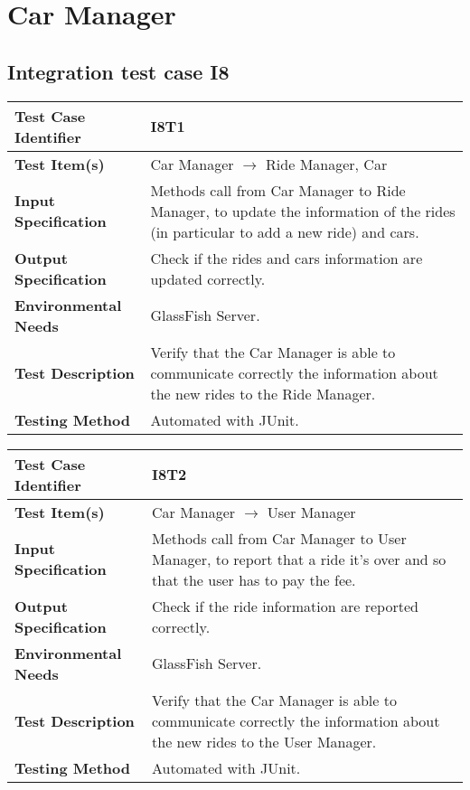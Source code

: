 \section{Car Manager}
\subsection{Integration test case I8}
\begin{tabular}{l p{}}
    \hline
    \textbf{Test Case Identifier} & I8T1\\
    \hline
    \textbf{Test Item(s)} & Car Manager $\rightarrow$ Ride Manager, Car\\
    \hline
    \textbf{Input Specification} & Methods call from Car Manager to Ride Manager, to update the information of the rides (in particular to add a new ride) and cars.\\
    \hline
    \textbf{Output Specification} & Check if the rides and cars information are updated correctly.\\
    \hline
    \textbf{Environmental Needs} & GlassFish Server.\\
    \hline
    \textbf{Test Description} & Verify that the Car Manager is able to communicate correctly the information about the new rides to the Ride Manager.\\
    \hline
    \textbf{Testing Method} & Automated with JUnit.\\
    \hline
\end{tabular}

\vspace{2em}

\noindent\begin{tabular}{l p{}}
    \hline
    \textbf{Test Case Identifier} & I8T2\\
    \hline
    \textbf{Test Item(s)} & Car Manager $\rightarrow$ User Manager\\
    \hline
    \textbf{Input Specification} & Methods call from Car Manager to User Manager, to report that a ride it's over and so that the user has to pay the fee.\\
    \hline
    \textbf{Output Specification} & Check if the ride information are reported correctly.\\
    \hline
    \textbf{Environmental Needs} & GlassFish Server.\\
    \hline
    \textbf{Test Description} & Verify that the Car Manager is able to communicate correctly the information about the new rides to the User Manager.\\
    \hline
    \textbf{Testing Method} & Automated with JUnit.\\
    \hline
\end{tabular}